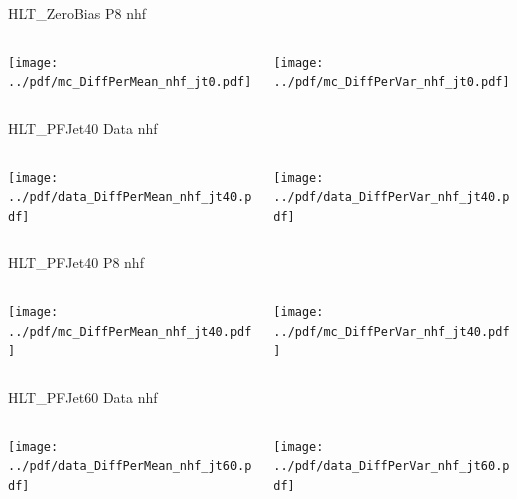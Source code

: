 \documentclass[9pt]{beamer}
\begin{document}
\begin{frame}[t]{HLT\_ZeroBias P8 nhf}
\begin{columns}[T]
  \begin{column}{.5\textwidth}
  \texttt{[image: ../pdf/mc\_DiffPerMean\_nhf\_jt0.pdf]}
  \end{column}
  \begin{column}{.5\textwidth}
  \texttt{[image: ../pdf/mc\_DiffPerVar\_nhf\_jt0.pdf]}
  \end{column}
\end{columns}
\end{frame}

\begin{frame}[t]{HLT\_PFJet40 Data nhf}
\begin{columns}[T]
  \begin{column}{.5\textwidth}
  \texttt{[image: ../pdf/data\_DiffPerMean\_nhf\_jt40.pdf]}
  \end{column}
  \begin{column}{.5\textwidth}
  \texttt{[image: ../pdf/data\_DiffPerVar\_nhf\_jt40.pdf]}
  \end{column}
\end{columns}
\end{frame}

\begin{frame}[t]{HLT\_PFJet40 P8 nhf}
\begin{columns}[T]
  \begin{column}{.5\textwidth}
  \texttt{[image: ../pdf/mc\_DiffPerMean\_nhf\_jt40.pdf]}
  \end{column}
  \begin{column}{.5\textwidth}
  \texttt{[image: ../pdf/mc\_DiffPerVar\_nhf\_jt40.pdf]}
  \end{column}
\end{columns}
\end{frame}

\begin{frame}[t]{HLT\_PFJet60 Data nhf}
\begin{columns}[T]
  \begin{column}{.5\textwidth}
  \texttt{[image: ../pdf/data\_DiffPerMean\_nhf\_jt60.pdf]}
  \end{column}
  \begin{column}{.5\textwidth}
  \texttt{[image: ../pdf/data\_DiffPerVar\_nhf\_jt60.pdf]}
  \end{column}
\end{columns}
\end{frame}
\end{document}
